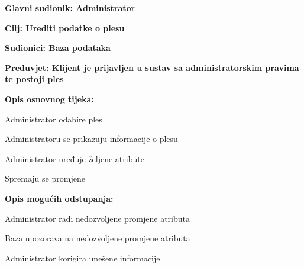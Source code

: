 						\noindent {}
						\begin{packed_item}
							
							\item \textbf{Glavni sudionik: Administrator}
							\item  \textbf{Cilj: Urediti podatke o plesu} 
							\item  \textbf{Sudionici: Baza podataka}
							\item  \textbf{Preduvjet: Klijent je prijavljen u sustav sa administratorskim pravima te postoji ples}
							\item  \textbf{Opis osnovnog tijeka: }
							
							\item[] \begin{packed_enum}
								
								\item Administrator odabire ples
								\item Administratoru se prikazuju informacije o plesu
								\item Administrator uređuje željene atribute
								\item Spremaju se promjene
							\end{packed_enum}
							
							\item  \textbf{Opis mogućih odstupanja:}
							
							\item[] \begin{packed_item}
								
								\item[3.a] Administrator radi nedozvoljene promjene atributa
								\item[] \begin{packed_enum}
									
									\item Baza upozorava na nedozvoljene promjene atributa
									\item Administrator korigira unešene informacije
									
								\end{packed_enum}
							
							\end{packed_item}
							
						\end{packed_item}
						\bigskip
							\bigskip
					
